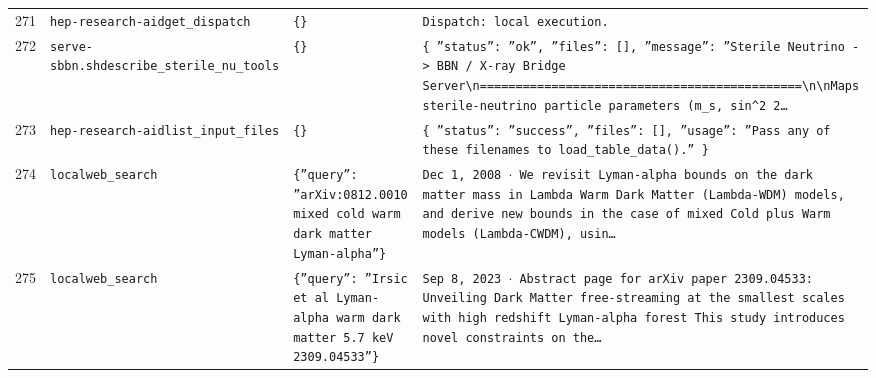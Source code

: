 \documentclass[11pt,a4paper]{article}
\begin{document}
\begin{longtable}{@{}p{}p{}p{}p{}@{}}
271 & \texttt{hep-research-aid}\newline\texttt{get\_\allowbreak{}dispatch} & \texttt{\{\}\allowbreak{}} & \texttt{Dispatch:\allowbreak{} local execution.} \\
272 & \texttt{serve-sbbn.sh}\newline\texttt{describe\_\allowbreak{}sterile\_\allowbreak{}nu\_\allowbreak{}tools} & \texttt{\{\}\allowbreak{}} & \texttt{\{   ''status'':\allowbreak{} ''ok'',\allowbreak{}   ''files'':\allowbreak{} []\allowbreak{},\allowbreak{}   ''message'':\allowbreak{} ''Sterile Neutrino -\textgreater{}\allowbreak{} BBN /\allowbreak{} X-ray Bridge Server\textbackslash{}\allowbreak{}n=\allowbreak{}=\allowbreak{}=\allowbreak{}=\allowbreak{}=\allowbreak{}=\allowbreak{}=\allowbreak{}=\allowbreak{}=\allowbreak{}=\allowbreak{}=\allowbreak{}=\allowbreak{}=\allowbreak{}=\allowbreak{}=\allowbreak{}=\allowbreak{}=\allowbreak{}=\allowbreak{}=\allowbreak{}=\allowbreak{}=\allowbreak{}=\allowbreak{}=\allowbreak{}=\allowbreak{}=\allowbreak{}=\allowbreak{}=\allowbreak{}=\allowbreak{}=\allowbreak{}=\allowbreak{}=\allowbreak{}=\allowbreak{}=\allowbreak{}=\allowbreak{}=\allowbreak{}=\allowbreak{}=\allowbreak{}=\allowbreak{}=\allowbreak{}=\allowbreak{}=\allowbreak{}=\allowbreak{}=\allowbreak{}=\allowbreak{}=\allowbreak{}\textbackslash{}\allowbreak{}n\textbackslash{}\allowbreak{}nMaps sterile-neutrino particle parameters (m\_\allowbreak{}s,\allowbreak{} sin\textasciicircum{}\allowbreak{}2 2\ldots{}\allowbreak{}} \\
273 & \texttt{hep-research-aid}\newline\texttt{list\_\allowbreak{}input\_\allowbreak{}files} & \texttt{\{\}\allowbreak{}} & \texttt{\{   ''status'':\allowbreak{} ''success'',\allowbreak{}   ''files'':\allowbreak{} []\allowbreak{},\allowbreak{}   ''usage'':\allowbreak{} ''Pass any of these filenames to load\_\allowbreak{}table\_\allowbreak{}data()\allowbreak{}.'' \}\allowbreak{}} \\
274 & \texttt{local}\newline\texttt{web\_\allowbreak{}search} & \texttt{\{''query'':\allowbreak{} ''arXiv:\allowbreak{}0812.0010 mixed cold warm dark matter Lyman-alpha''\}\allowbreak{}} & \texttt{Dec 1,\allowbreak{} 2008 $\cdot$ We revisit Lyman-alpha bounds on the dark matter mass in Lambda Warm Dark Matter (Lambda-WDM)\allowbreak{} models,\allowbreak{} and derive new bounds in the case of mixed Cold plus Warm models (Lambda-CWDM)\allowbreak{},\allowbreak{} usin\ldots{}\allowbreak{}} \\
275 & \texttt{local}\newline\texttt{web\_\allowbreak{}search} & \texttt{\{''query'':\allowbreak{} ''Irsic et al Lyman-alpha warm dark matter 5.7 keV 2309.04533''\}\allowbreak{}} & \texttt{Sep 8,\allowbreak{} 2023 $\cdot$ Abstract page for arXiv paper 2309.04533:\allowbreak{} Unveiling Dark Matter free-streaming at the smallest scales with high redshift Lyman-alpha forest This study introduces novel constraints on the\ldots{}\allowbreak{}} \\

\end{longtable}
\end{document}
